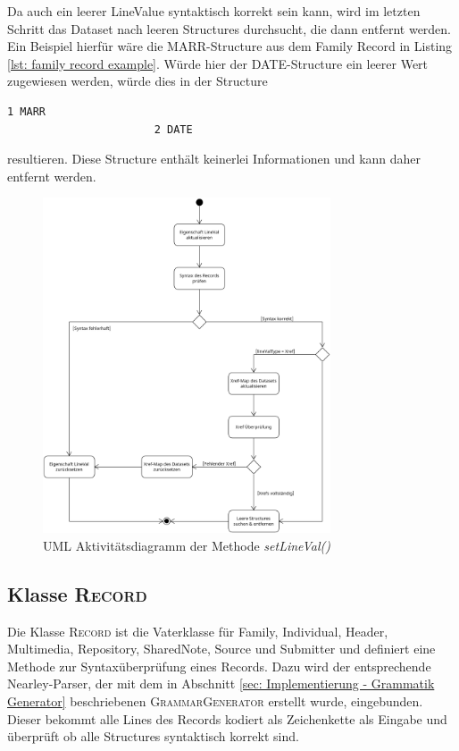Da auch ein leerer LineValue syntaktisch korrekt sein kann, wird im letzten Schritt das Dataset nach leeren Structures durchsucht, die dann entfernt werden. Ein Beispiel hierfür wäre die MARR-Structure aus dem Family Record in Listing \ref{lst: family record example}. Würde hier der DATE-Structure ein leerer Wert zugewiesen werden, würde dies in der Structure
\begin{lstlisting}[frame=none]
					   1 MARR
					   2 DATE
\end{lstlisting}
resultieren. Diese Structure enthält keinerlei Informationen und kann daher entfernt werden.
 
\begin{figure}[h]
	\centering
	\includegraphics[width=0.76\textwidth]{images/UML_Activity_SetLineVal.png}
	\caption{UML Aktivitätsdiagramm der Methode \textit{setLineVal()}}
	\label{fig: UML Aktivität setLineVal}
\end{figure}


\subsection{Klasse \textsc{Record}}
\label{subsec: Implementierung - Gedcom Struktur - Klasse Record}
Die Klasse \textsc{Record} ist die Vaterklasse für Family, Individual, Header, Multimedia, Repository, SharedNote, Source und Submitter und definiert eine Methode zur Syntaxüberprüfung eines Records. Dazu wird der entsprechende Nearley-Parser, der mit dem in Abschnitt \ref{sec: Implementierung - Grammatik Generator} beschriebenen \textsc{GrammarGenerator} erstellt wurde, eingebunden. Dieser bekommt alle Lines des Records kodiert als Zeichenkette als Eingabe und überprüft ob alle Structures syntaktisch korrekt sind.


